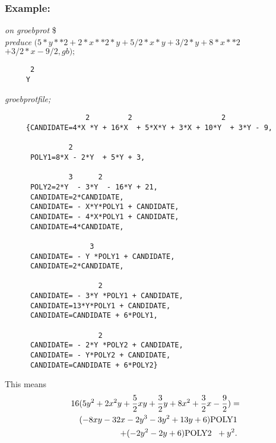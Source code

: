 \subsubsection*{ Example:}
{\it on groebprot} \$ \\
{\it preduce} $ (5*y**2 + 2*x**2*y + 5/2*x*y + 3/2*y + 8*x**2 $ \\
\hspace*{+1cm} $+ 3/2*x - 9/2, gb);$
\begin{verbatim}
      2
     Y
\end{verbatim}
{\it groebprotfile;}
\begin{verbatim}
                   2         2                     2
     {CANDIDATE=4*X *Y + 16*X  + 5*X*Y + 3*X + 10*Y  + 3*Y - 9,

               2
      POLY1=8*X - 2*Y  + 5*Y + 3,

               3      2
      POLY2=2*Y  - 3*Y  - 16*Y + 21,
      CANDIDATE=2*CANDIDATE,
      CANDIDATE= - X*Y*POLY1 + CANDIDATE,
      CANDIDATE= - 4*X*POLY1 + CANDIDATE,
      CANDIDATE=4*CANDIDATE,

                    3
      CANDIDATE= - Y *POLY1 + CANDIDATE,
      CANDIDATE=2*CANDIDATE,

                      2
      CANDIDATE= - 3*Y *POLY1 + CANDIDATE,
      CANDIDATE=13*Y*POLY1 + CANDIDATE,
      CANDIDATE=CANDIDATE + 6*POLY1,

                      2
      CANDIDATE= - 2*Y *POLY2 + CANDIDATE,
      CANDIDATE= - Y*POLY2 + CANDIDATE,
      CANDIDATE=CANDIDATE + 6*POLY2}

 \end{verbatim}
This means
\begin{eqnarray*}
\lefteqn{
16 (5 y^2 + 2 x^2 y + \frac{5}{2} x y + \frac{3}{2} y + 8 x^2+ \frac{3}{2} x -
\frac{9}{2})=} \\ & &
(-8 x y -32 x -2 y^3 -3 y^2 + 13 y + 6) \mbox{POLY1} \\
& & \; + (-2 y^2 -2 y + 6) \mbox{POLY2  } \; + y^2.
\end{eqnarray*}





